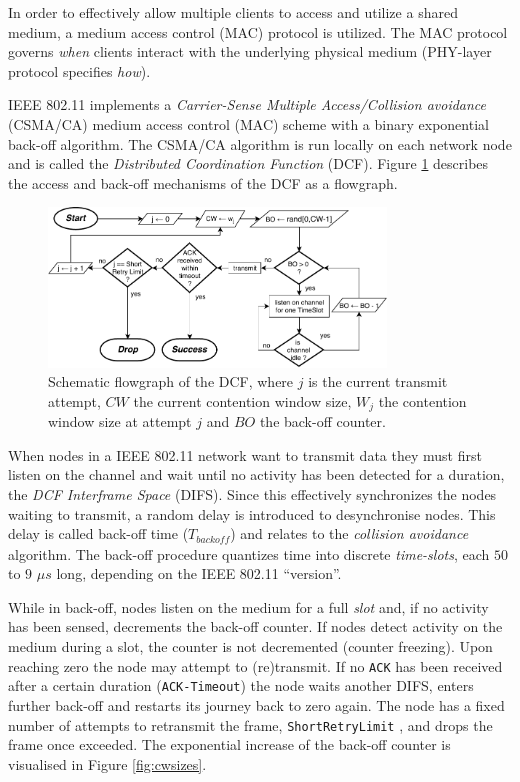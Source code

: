 In order to effectively allow multiple clients to access and utilize a shared
medium, a medium access control (MAC) protocol is utilized. The MAC
protocol governs \emph{when} clients interact with the underlying physical
medium (PHY-layer protocol specifies \emph{how}).

IEEE 802.11 implements a \emph{Carrier-Sense Multiple Access/Collision
avoidance} (CSMA/CA) medium access control (MAC) scheme with a binary
exponential back-off algorithm. The CSMA/CA algorithm is run locally on each
network node and is called the \emph{Distributed Coordination Function} (DCF).
Figure \ref{fig:dcfgraph} describes the access and back-off mechanisms of the
DCF as a flowgraph.

\begin{figure}
\center
\includegraphics[width=0.8\textwidth]{images/ieee-80211-dcf.pdf}
\caption{Schematic flowgraph of the DCF, where $j$ is the current transmit attempt, $CW$ the current contention window size, $W_j$ the contention window size at attempt $j$ and $BO$ the back-off counter.}
\label{fig:dcfgraph}
\end{figure}


When nodes in a IEEE 802.11 network want to transmit data they must first
listen on the channel and wait until no activity has been detected for a
duration, the \emph{DCF Interframe Space} (DIFS). Since this effectively
synchronizes the nodes waiting to transmit, a random delay is introduced to
desynchronise nodes. This delay is called back-off time
($T_{\mathit{backoff}}$) and relates to the \emph{collision avoidance}
algorithm. The back-off procedure quantizes time into discrete
\emph{time-slots}, each $50$ to $9$ $\mu s$ long, depending on the IEEE
802.11 ``version''.

While in back-off, nodes listen on the medium for a full \emph{slot} and, if
no activity has been sensed, decrements the back-off counter. If nodes detect
activity on the medium during a slot, the counter is not decremented (counter
freezing). Upon reaching zero the node may attempt to (re)transmit. If no
\texttt{ACK} has been received after a certain duration (\texttt{ACK-Timeout})
the node waits another DIFS, enters further back-off and restarts its journey
back to zero again. The node has a fixed number of attempts to retransmit the
frame, \texttt{ShortRetryLimit} \cite{654749}, and drops the frame once
exceeded. The exponential increase of the back-off counter is visualised in
Figure \ref{fig:cwsizes}.

